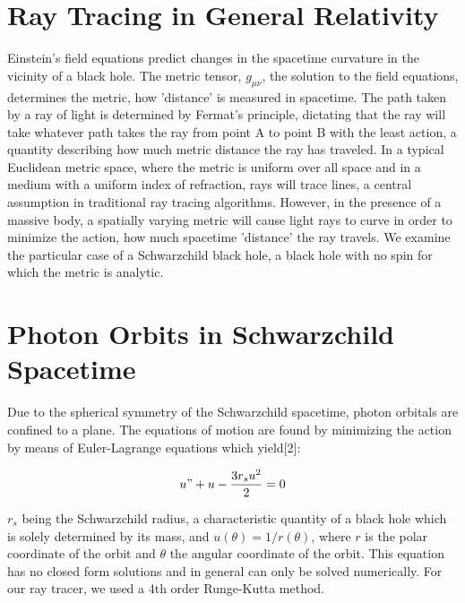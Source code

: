\documentclass[sigconf]{acmart}
\begin{document}
%
\maketitle

\section{Ray Tracing in General Relativity}

Einstein's field equations predict changes in the spacetime curvature in the vicinity of a black hole. The metric tensor, $g_{\mu\nu}$, the solution to the field equations, determines the metric, how 'distance' is measured in spacetime. The path taken by a ray of light is determined by Fermat's principle, dictating that the ray will take whatever path takes the ray from point A to point B with the least action, a quantity describing how much metric distance the ray has traveled. In a typical Euclidean metric space, where the metric is uniform over all space and in a medium with a uniform index of refraction, rays will trace lines, a central assumption in traditional ray tracing algorithms. However, in the presence of a massive body, a spatially varying metric will cause light rays to curve in order to minimize the action, how much spacetime 'distance' the ray travels.  We examine the particular case of a Schwarzchild black hole, a black hole with no spin for which the metric is analytic.

\section{Photon Orbits in Schwarzchild Spacetime}

Due to the spherical symmetry of the Schwarzchild spacetime, photon orbitals are confined to a plane.  The equations of motion are found by minimizing the action by means of Euler-Lagrange equations which yield[2]:

\begin{displaymath}
  u" + u - \frac{3r_su^2}{2} = 0
\end{displaymath}

$r_s$ being the Schwarzchild radius, a characteristic quantity of a black hole which is solely determined by its mass, and $u(\theta) = 1/r(\theta)$, where $r$ is the polar coordinate of the orbit and $\theta$ the angular coordinate of the orbit.  This equation has no closed form solutions and in general can only be solved numerically.  For our ray tracer, we used a 4th order Runge-Kutta method.
\end{document}
